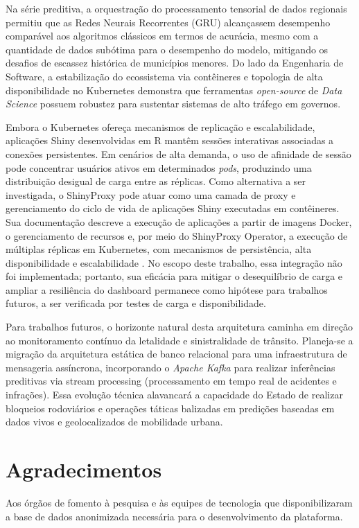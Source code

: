 \documentclass[10pt,conference]{IEEEtran}
\begin{document}
Na série preditiva, a orquestração do processamento tensorial de dados regionais permitiu que as Redes Neurais Recorrentes (GRU) alcançassem desempenho comparável aos algoritmos clássicos em termos de acurácia, mesmo com a quantidade de dados subótima para o desempenho do modelo, mitigando os desafios de escassez histórica de municípios menores. Do lado da Engenharia de Software, a estabilização do ecossistema via contêineres e topologia de alta disponibilidade no Kubernetes demonstra que ferramentas \textit{open-source} de \textit{Data Science} possuem robustez para sustentar sistemas de alto tráfego em governos. 

Embora o Kubernetes ofereça mecanismos de replicação e escalabilidade, aplicações Shiny desenvolvidas em R mantêm sessões interativas associadas a conexões persistentes. Em cenários de alta demanda, o uso de afinidade de sessão pode concentrar usuários ativos em determinados \textit{pods}, produzindo uma distribuição desigual de carga entre as réplicas. Como alternativa a ser investigada, o ShinyProxy pode atuar como uma camada de proxy e gerenciamento do ciclo de vida de aplicações Shiny executadas em contêineres. Sua documentação descreve a execução de aplicações a partir de imagens Docker, o gerenciamento de recursos e, por meio do ShinyProxy Operator, a execução de múltiplas réplicas em Kubernetes, com mecanismos de persistência, alta disponibilidade e escalabilidade \cite{openanalytics2026shinyproxy,openanalytics2026shinyproxyapps}. No escopo deste trabalho, essa integração não foi implementada; portanto, sua eficácia para mitigar o desequilíbrio de carga e ampliar a resiliência do dashboard permanece como hipótese para trabalhos futuros, a ser verificada por testes de carga e disponibilidade.

Para trabalhos futuros, o horizonte natural desta arquitetura caminha em direção ao monitoramento contínuo da letalidade e sinistralidade de trânsito. Planeja-se a migração da arquitetura estática de banco relacional para uma infraestrutura de mensageria assíncrona, incorporando o \textit{Apache Kafka} para realizar inferências preditivas via stream processing (processamento em tempo real de acidentes e infrações). Essa evolução técnica alavancará a capacidade do Estado de realizar bloqueios rodoviários e operações táticas balizadas em predições baseadas em dados vivos e geolocalizados de mobilidade urbana.



\section*{Agradecimentos}
Aos órgãos de fomento à pesquisa e às equipes de tecnologia que disponibilizaram a base de dados anonimizada necessária para o desenvolvimento da plataforma.
\end{document}
